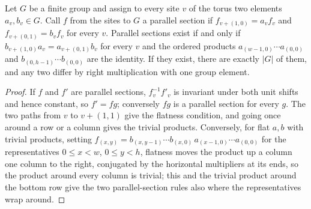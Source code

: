 \begin{lemma}%
    \label{lem:peps_torus_parallel_section}
    \leanok
    Let $G$ be a finite group and assign to every site $v$ of the torus two
    elements $a_v,b_v\in G$. Call $f$ from the sites to $G$ a parallel section
    if $f_{v+(1,0)}=a_vf_v$ and $f_{v+(0,1)}=b_vf_v$ for every $v$. Parallel
    sections exist if and only if
    $b_{v+(1,0)}a_v=a_{v+(0,1)}b_v$ for every $v$ and the ordered products
    $a_{(w-1,0)}\cdots a_{(0,0)}$ and $b_{(0,h-1)}\cdots b_{(0,0)}$ are the
    identity. If they exist, there are exactly $|G|$ of them, and any two
    differ by right multiplication with one group element.
\end{lemma}

\begin{proof}\leanok
    If $f$ and $f'$ are parallel sections, $f_v^{-1}f'_v$ is invariant under
    both unit shifts and hence constant, so $f'=fg$; conversely $fg$ is a
    parallel section for every $g$. The two paths from $v$ to $v+(1,1)$ give
    the flatness condition, and going once around a row or a column gives
    the trivial products. Conversely, for flat $a,b$ with trivial products,
    setting $f_{(x,y)}=b_{(x,y-1)}\cdots b_{(x,0)}\,a_{(x-1,0)}\cdots a_{(0,0)}$
    for the representatives $0\le x<w$, $0\le y<h$, flatness moves the
    product up a column one column to the right, conjugated by the
    horizontal multipliers at its ends, so the product around every column is
    trivial; this and the trivial product around the bottom row give the
    two parallel-section rules also where the representatives wrap around.
\end{proof}

